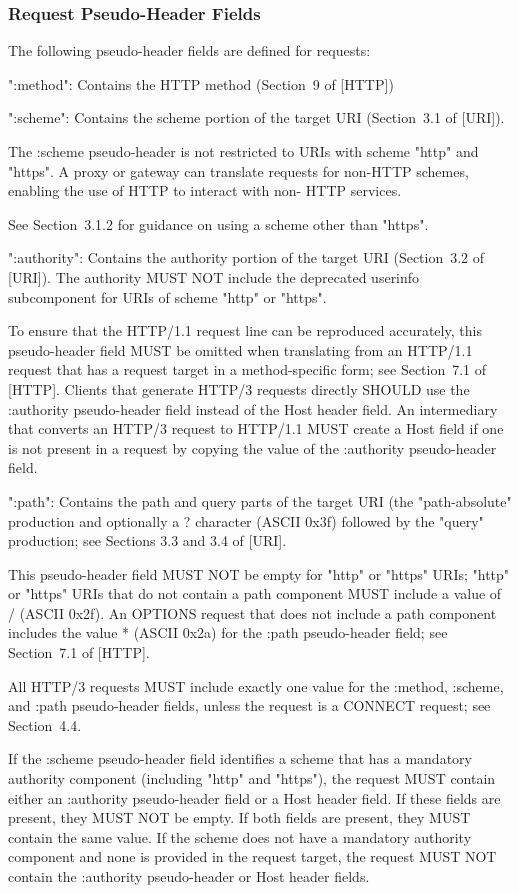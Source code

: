 \documentclass{article}
\begin{document}
\subsubsection{Request Pseudo-Header Fields}

The following pseudo-header fields are defined for requests:

":method":  Contains the HTTP method (Section~9 of [HTTP])

":scheme":  Contains the scheme portion of the target URI (Section~3.1 of [URI]).

The :scheme pseudo-header is not restricted to URIs with scheme "http" and "https".  A proxy or gateway can translate requests for non-HTTP schemes, enabling the use of HTTP to interact with non- HTTP services.

See Section~3.1.2 for guidance on using a scheme other than "https".

":authority":  Contains the authority portion of the target URI (Section~3.2 of [URI]).  The authority MUST NOT include the deprecated userinfo subcomponent for URIs of scheme "http" or "https".

To ensure that the HTTP/1.1 request line can be reproduced accurately, this pseudo-header field MUST be omitted when translating from an HTTP/1.1 request that has a request target in a method-specific form; see Section~7.1 of [HTTP].  Clients that generate HTTP/3 requests directly SHOULD use the :authority pseudo-header field instead of the Host header field.  An intermediary that converts an HTTP/3 request to HTTP/1.1 MUST create a Host field if one is not present in a request by copying the value of the :authority pseudo-header field.

":path":  Contains the path and query parts of the target URI (the "path-absolute" production and optionally a ? character (ASCII 0x3f) followed by the "query" production; see Sections 3.3 and 3.4 of [URI].

This pseudo-header field MUST NOT be empty for "http" or "https" URIs; "http" or "https" URIs that do not contain a path component MUST include a value of / (ASCII 0x2f).  An OPTIONS request that does not include a path component includes the value * (ASCII 0x2a) for the :path pseudo-header field; see Section~7.1 of [HTTP].

All HTTP/3 requests MUST include exactly one value for the :method, :scheme, and :path pseudo-header fields, unless the request is a CONNECT request; see Section~4.4.

If the :scheme pseudo-header field identifies a scheme that has a mandatory authority component (including "http" and "https"), the request MUST contain either an :authority pseudo-header field or a Host header field.  If these fields are present, they MUST NOT be empty.  If both fields are present, they MUST contain the same value. If the scheme does not have a mandatory authority component and none is provided in the request target, the request MUST NOT contain the :authority pseudo-header or Host header fields.
\end{document}

